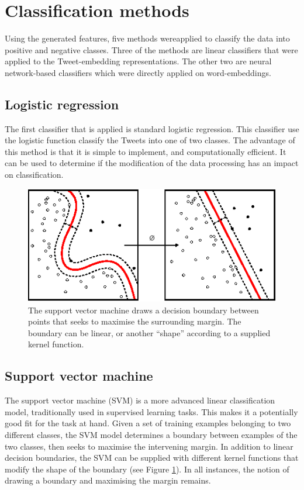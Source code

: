 \section{Classification methods}
\label{sec:methods}
Using the generated features, five methods wereapplied to classify the data into positive and negative classes. Three of the methods are linear classifiers that were applied to the Tweet-embedding representations. The other two are neural network-based classifiers which were directly applied on word-embeddings.

\subsection{Logistic regression}
The first classifier that is applied is standard logistic regression. This classifier use the logistic function classify the Tweets into one of two classes. The advantage of this method is that it is simple to implement, and computationally efficient. It can be used to determine if the modification of the data processing has an impact on classification.

\begin{figure}[h!]
\centering
	\includegraphics[scale=1.2]{SVM} 
\caption{The support vector machine draws a decision boundary between points that seeks to maximise the surrounding margin. The boundary can be linear, or another ``shape'' according to a supplied kernel function. \cite{wikiSVM}}
\label{plot:SVM}
\end{figure}
\FloatBarrier

\subsection{Support vector machine}
The support vector machine (SVM) is a more advanced linear classification model, traditionally used in supervised learning tasks. This makes it a potentially good fit for the task at hand. Given a set of training examples belonging to two different classes, the SVM model determines a boundary between examples of the two classes, then seeks to maximise the intervening margin. In addition to linear decision boundaries, the SVM can be supplied with different kernel functions that modify the shape of the boundary (see Figure \ref{plot:SVM}). In all instances, the notion of drawing a boundary and maximising the margin remains.

